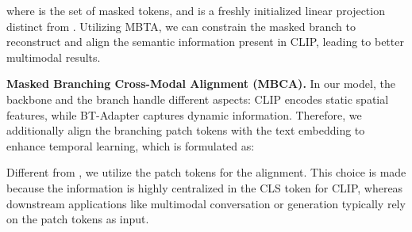 \documentclass{article} \usepackage{iclr2024_conference,times}
\begin{document}
 where  is the set of masked tokens, and  is a freshly initialized linear projection distinct from . Utilizing MBTA, we can constrain the masked branch to reconstruct and align the semantic information present in CLIP, leading to better multimodal results.

 \noindent \textbf{Masked Branching Cross-Modal Alignment (MBCA).} 
In our model, the backbone and the branch handle different aspects: CLIP encodes static spatial features, while BT-Adapter captures dynamic information. Therefore, we additionally align the branching patch tokens with the text embedding to enhance temporal learning, which is formulated as:

Different from , we utilize the patch tokens for the alignment. This choice is made because the information is highly centralized in the CLS token for CLIP, whereas downstream applications like multimodal conversation or generation typically rely on the patch tokens as input.
\end{document}

